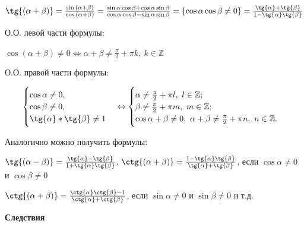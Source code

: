 \documentclass{article}
\begin{document}
        \(\tg{(\alpha + \beta)} = \frac{\sin{(\alpha + \beta)}}{\cos{(\alpha + \beta)}} = \frac{\sin{\alpha}\cos{\beta} + \cos{\alpha}\sin{\beta}}{\cos{\alpha}\cos{\beta} - \sin{\alpha}\sin{\beta}} = \{\cos{\alpha}\cos{\beta} \not = 0\} = \frac{\tg{\alpha} + \tg{\beta}}{1 - \tg{\alpha}\tg{\beta}}\)
        
        О.О. левой части формулы:
        
        \(\cos{(\alpha + \beta)} \not = 0 \Leftrightarrow \alpha + \beta \not = \frac{\pi}{2} + \pi k,\ k \in \mathbb{Z}\)
        
        О.О. правой части формулы:
        
        \begin{equation}
            \begin{cases}
                \cos{\alpha} \not = 0,\\
                \cos{\beta} \not = 0,\\
                \tg{\alpha}*\tg{\beta} \not = 1
            \end{cases}\Leftrightarrow
            \begin{cases}
                \alpha \not = \frac{\pi}{2} + \pi l,\ l \in \mathbb{Z};\\
                \beta \not = \frac{\pi}{2} + \pi m,\ m \in \mathbb{Z};\\
                \cos{\alpha + \beta} \not = 0,\ \alpha + \beta \not = \frac{\pi}{2} + \pi n,\ n \in \mathbb{Z}.
            \end{cases}
        \end{equation}
        
        Аналогично можно получить формулы:
        
        \(\tg{(\alpha - \beta)} = \frac{\tg{\alpha} - \tg{\beta}}{1 + \tg{\alpha}\tg{\beta}}\), \(\ctg{(\alpha + \beta)} = \frac{1 - \tg{\alpha}\tg{\beta}}{\tg{\alpha} + \tg{\beta}}\), если \(\cos{\alpha} \not = 0\) и \(\cos{\beta} \not = 0\)
        
        \(\ctg{(\alpha + \beta)} = \frac{\ctg{\alpha}\ctg{\beta} - 1}{\ctg{\alpha} + \ctg{\beta}}\), если \(\sin{\alpha} \not = 0\) и \(\sin{\beta} \not = 0\) и т.д.
        
        \textbf{Следствия}
        
\end{document}
